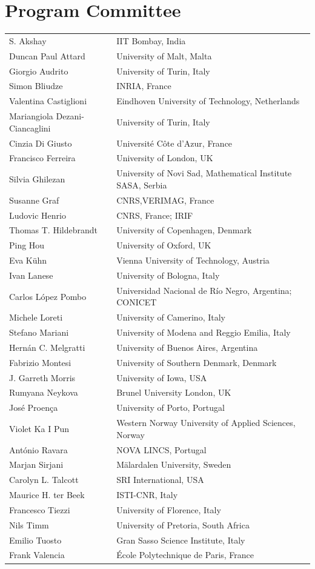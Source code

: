 \documentclass[runningheads]{llncs}
\begin{document}
\section*{Program Committee}
\begin{longtable}{p{}p{}}
	
S. Akshay &	IIT Bombay, India\\
Duncan Paul Attard & University of Malt, Malta \\
Giorgio Audrito &	University of Turin, Italy \\
Simon Bliudze &	INRIA, France \\
Valentina Castiglioni &  Eindhoven University of Technology, Netherlands \\
Mariangiola Dezani-Ciancaglini &	University of Turin, Italy\\
Cinzia Di Giusto &	Université Côte d’Azur, France \\
Francisco Ferreira & University of London, UK \\
Silvia Ghilezan & University of Novi Sad, Mathematical Institute SASA, Serbia\\
Susanne Graf & CNRS,VERIMAG, France\\
Ludovic Henrio & CNRS, France; IRIF \\
Thomas T. Hildebrandt & 	University of Copenhagen, Denmark \\
Ping Hou & University of Oxford, UK \\
Eva Kühn & Vienna University of Technology, Austria \\
Ivan Lanese & University of Bologna, Italy \\
Carlos López Pombo &  Universidad Nacional de Río Negro, Argentina; CONICET \\
Michele Loreti &	University of Camerino, Italy \\
Stefano Mariani & University of Modena and Reggio Emilia, Italy \\
Hernán C. Melgratti & University of Buenos Aires, Argentina \\
Fabrizio Montesi & University of Southern Denmark, Denmark \\
J. Garreth Morris & University of Iowa, USA\\
Rumyana Neykova & Brunel University London, UK \\
José Proença & University of Porto, Portugal \\
Violet Ka I Pun & Western Norway University of Applied Sciences, Norway \\
António Ravara & 	NOVA LINCS, Portugal \\
Marjan Sirjani & 	Mälardalen University, Sweden \\
Carolyn L. Talcott & 	SRI International, USA \\
Maurice H. ter Beek & ISTI-CNR, Italy \\
Francesco Tiezzi & University of Florence, Italy \\
Nils Timm & University of Pretoria, South Africa \\	
Emilio Tuosto & Gran Sasso Science Institute, Italy \\
Frank Valencia & École Polytechnique de Paris, France
\end{longtable}
\end{document}
